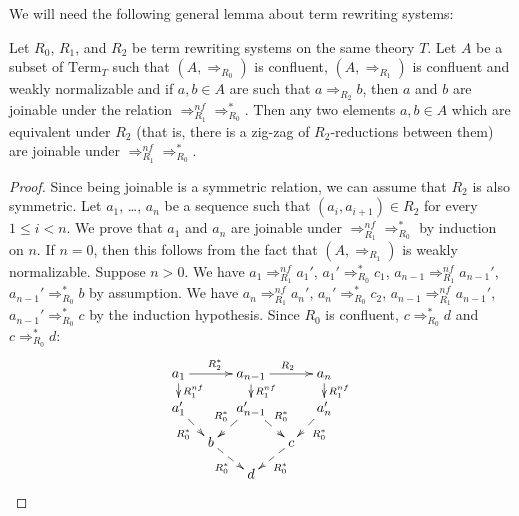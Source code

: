 \documentclass[reqno]{amsart}
\theoremstyle{definition}
\theoremstyle{remark}
\newcommand{\Term}{\mathrm{Term}}
\numberwithin{figure}{section}
\begin{document}
We will need the following general lemma about term rewriting systems:

\begin{lem}[conf-nf]
Let $R_0$, $R_1$, and $R_2$ be term rewriting systems on the same theory $T$.
Let $A$ be a subset of $\Term_T$ such that $(A,\Rightarrow_{R_0})$ is confluent, $(A,\Rightarrow_{R_1})$ is confluent and weakly normalizable
and if $a,b \in A$ are such that $a \Rightarrow_{R_2} b$, then $a$ and $b$ are joinable under the relation $\Rightarrow_{R_1}^{nf} \Rightarrow_{R_0}^*$.
Then any two elements $a,b \in A$ which are equivalent under $R_2$ (that is, there is a zig-zag of $R_2$-reductions between them) are joinable under $\Rightarrow_{R_1}^{nf} \Rightarrow_{R_0}^*$.
\end{lem}
\begin{proof}
Since being joinable is a symmetric relation, we can assume that $R_2$ is also symmetric.
Let $a_1$, \ldots, $a_n$ be a sequence such that $(a_i, a_{i+1}) \in R_2$ for every $1 \leq i < n$.
We prove that $a_1$ and $a_n$ are joinable under $\Rightarrow_{R_1}^{nf} \Rightarrow_{R_0}^*$ by induction on $n$.
If $n = 0$, then this follows from the fact that $(A,\Rightarrow_{R_1})$ is weakly normalizable.
Suppose $n > 0$.
We have $a_1 \Rightarrow_{R_1}^{nf} a_1'$, $a_1' \Rightarrow_{R_0}^* c_1$, $a_{n-1} \Rightarrow_{R_1}^{nf} a_{n-1}'$, $a_{n-1}' \Rightarrow_{R_0}^* b$ by assumption.
We have $a_n \Rightarrow_{R_1}^{nf} a_n'$, $a_n' \Rightarrow_{R_0}^* c_2$, $a_{n-1} \Rightarrow_{R_1}^{nf} a_{n-1}'$, $a_{n-1}' \Rightarrow_{R_0}^* c$ by the induction hypothesis.
Since $R_0$ is confluent, $c \Rightarrow_{R_0}^* d$ and $c \Rightarrow_{R_0}^* d$:
\[ \xymatrix@=1em{  a_1 \ar[rr]^{R_2^*} \ar@{-->}[d]^{R_1^{nf}} &                           & a_{n-1} \ar[rr]^{R_2} \ar@{-->}[d]^{R_1^{nf}}         &                           & a_n \ar@{-->}[d]^{R_1^{nf}}   \\
                    a_1' \ar@{-->}[rd]_{R_0^*}                  &                           & a_{n-1}' \ar@{-->}[ld]_{R_0^*} \ar@{-->}[rd]^{R_0^*}  &                           & a_n' \ar@{-->}[ld]^{R_0^*}    \\
                                                                & b \ar@{-->}[rd]_{R_0^*}   &                                                       & c \ar@{-->}[ld]^{R_0^*}   &                               \\
                                                                &                           & d                                                     &                           &
                 } \]
\end{proof}
\end{document}

